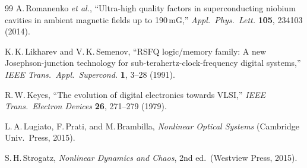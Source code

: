 \documentclass[12pt,a4paper,twoside]{article}
\begin{document}
\begin{thebibliography}{99}
A.\,Romanenko \emph{et al.}, ``Ultra-high quality factors in superconducting niobium cavities in ambient magnetic fields up to 190\,mG,'' \emph{Appl.\ Phys.\ Lett.} \textbf{105}, 234103 (2014).

K.\,K.\,Likharev and V.\,K.\,Semenov, ``RSFQ logic/memory family: A new Josephson-junction technology for sub-terahertz-clock-frequency digital systems,'' \emph{IEEE Trans.\ Appl.\ Supercond.} \textbf{1}, 3--28 (1991).

R.\,W.\,Keyes, ``The evolution of digital electronics towards VLSI,'' \emph{IEEE Trans.\ Electron Devices} \textbf{26}, 271--279 (1979).

L.\,A.\,Lugiato, F.\,Prati, and M.\,Brambilla, \emph{Nonlinear Optical Systems} (Cambridge Univ.\ Press, 2015).

S.\,H.\,Strogatz, \emph{Nonlinear Dynamics and Chaos}, 2nd ed.\ (Westview Press, 2015).

\end{thebibliography}
\end{document}
